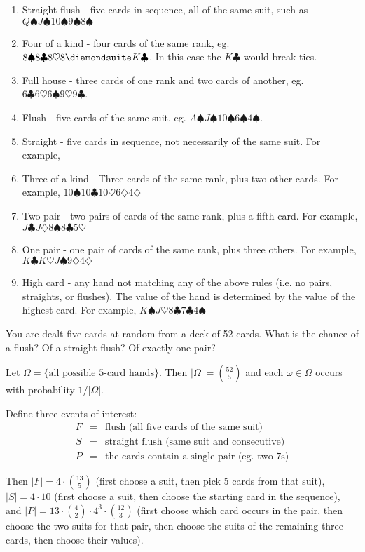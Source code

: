 \begin{enumerate}
\begin{enumerate}
\item Straight flush - five cards in sequence, all of the
  same suit, such as $Q\spadesuit J\spadesuit 10\spadesuit 9\spadesuit
  8\spadesuit$

\item Four of a kind - four cards of the same rank, eg. $8\spadesuit
  8\clubsuit 8\heartsuit 8\diamondsuite K\clubsuit$. In this case the
  $K\clubsuit$ would break ties.

\item Full house - three cards of one rank and two cards of another,
  eg. $6\clubsuit 6\heartsuit 6\spadesuit 9\heartsuit 9\clubsuit$.
\item Flush - five cards of the same suit, eg. $A\spadesuit
  J\spadesuit 10\spadesuit 6\spadesuit 4\spadesuit$.
\item Straight - five cards in sequence, not necessarily of the same
  suit. For example, 
\item Three of a kind - Three cards of the same rank, plus two other
  cards. For example, $10\spadesuit 10\clubsuit 10\heartsuit
  6\diamondsuit 4\diamondsuit$
\item Two pair - two pairs of cards of the same rank, plus a fifth
  card. For example, $J\clubsuit J\diamondsuit 8\spadesuit 8\clubsuit 5\heartsuit$
\item One pair - one pair of cards of the same rank, plus three
  others. For example, $K\clubsuit K\heartsuit J\spadesuit
  9\diamondsuit 4\diamondsuit$
\item High card - any hand not matching any of the above rules
  (i.e. no pairs, straights, or flushes). The value of the hand is
  determined by the value of the highest card. For example,
  $K\spadesuit J\heartsuit 8\clubsuit 7\clubsuit 4\spadesuit$

\end{enumerate}

You are dealt five cards at random from a deck of 52 cards. What is the chance of a flush? Of a straight flush? Of exactly one pair?

Let $\Omega = \{\mbox{all possible 5-card hands}\}$. Then $|\Omega| = {52 \choose 5}$ and each $\omega \in \Omega$ occurs with probability $1/|\Omega|$. 

Define three events of interest: 
\begin{eqnarray*}
F & = & \mbox{flush (all five cards of the same suit)} \\
S & = & \mbox{straight flush (same suit and consecutive)} \\
P & = & \mbox{the cards contain a single pair (eg. two 7s)}
\end{eqnarray*}

Then $|F| = 4 \cdot {13 \choose 5}$ (first choose a suit, then pick 5 cards from that suit), $|S| = 4 \cdot 10$ (first choose a suit, then choose the starting card in the sequence), and $|P| = 13 \cdot {4 \choose 2} \cdot 4^3 \cdot {12 \choose 3}$ (first choose which card occurs in the pair, then choose the two suits for that pair, then choose the suits of the remaining three cards, then choose their values).
 
\end{enumerate}

